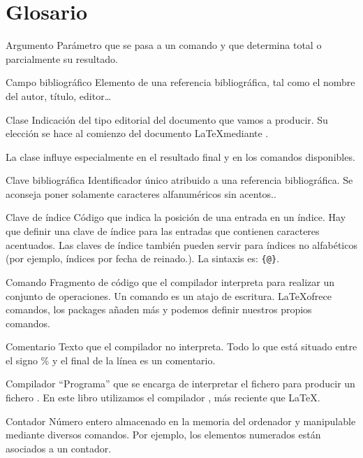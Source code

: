 \chapter{Glosario}


\begin{glossaire}
\item[Argumento] Parámetro que se pasa a un comando y que determina total o parcialmente su resultado.


\item[Campo bibliográfico] Elemento de una referencia bibliográfica, tal como el nombre del autor, título, editor…


\item[Clase] Indicación del tipo editorial del documento que vamos a producir. Su elección se hace al comienzo del documento \LaTeX mediante . 

La clase influye especialmente en el resultado final y en los comandos disponibles.

\item[Clave bibliográfica] Identificador único atribuido a una referencia bibliográfica. Se aconseja poner solamente caracteres alfanuméricos sin acentos..

\item[Clave de índice] Código que indica la posición de una entrada en un índice. Hay que definir una clave de índice para las entradas que contienen caracteres acentuados. Las claves de índice también pueden servir para índices no alfabéticos (por ejemplo, índices por fecha de reinado.). La sintaxis es: \verb|{|\verb|@|\verb|}|.

\item[Comando] Fragmento de código que el compilador interpreta para realizar un conjunto de operaciones. Un comando es un atajo de escritura. \LaTeX ofrece comandos, los packages añaden más y podemos definir nuestros propios comandos.

\item[Comentario] Texto que el compilador no interpreta. Todo lo que está situado entre el signo \% y el final de la línea es un comentario.

\item[Compilador] \enquote{Programa} que se encarga de interpretar el fichero  para producir un fichero . En este libro utilizamos el compilador \XeLaTeX, más reciente que \LaTeX.

\item[Contador] Número entero almacenado en la memoria del ordenador y manipulable mediante diversos comandos. Por ejemplo, los elementos numerados están asociados a un contador.



\end{glossaire}
